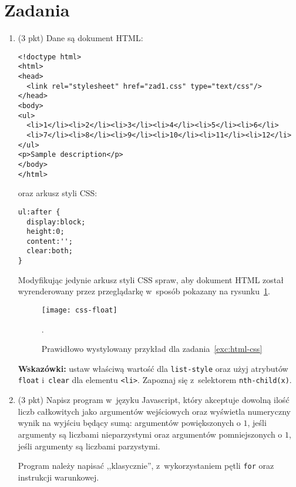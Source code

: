 \documentclass[12pt]{article}
\begin{document}
    \section*{Zadania}
    \begin{enumerate}
        \item\label{exc:html-css}
            (3 pkt) Dane są dokument HTML:
            \begin{verbatim}
<!doctype html>
<html>
<head>
  <link rel="stylesheet" href="zad1.css" type="text/css"/>
</head>
<body>
<ul>
  <li>1</li><li>2</li><li>3</li><li>4</li><li>5</li><li>6</li>
  <li>7</li><li>8</li><li>9</li><li>10</li><li>11</li><li>12</li>
</ul>
<p>Sample description</p>
</body>
</html>
            \end{verbatim}
            oraz arkusz styli CSS:
            \begin{verbatim}
ul:after {
  display:block;
  height:0;
  content:'';
  clear:both;
}
            \end{verbatim}
            Modyfikując jedynie arkusz styli CSS spraw, aby dokument HTML został wyrenderowany przez przeglądarkę w~sposób pokazany na rysunku~\ref{fig:css-float}.
            \begin{figure}[hb]
                \centering
                \texttt{[image: css-float]}
                \caption{Prawidłowo wystylowany przykład dla zadania~\ref{exc:html-css}}.
                \label{fig:css-float}
            \end{figure}

            \textbf{Wskazówki:} ustaw właściwą wartość dla \texttt{list-style} oraz użyj atrybutów \texttt{float} i~\texttt{clear} dla elementu \texttt{<li>}. Zapoznaj się z~selektorem \texttt{nth-child(x)}.
        \item\label{exc:javascript-classic}
            (3 pkt) Napisz program w~języku Javascript, który akceptuje dowolną ilość liczb całkowitych jako argumentów wejściowych oraz wyświetla numeryczny wynik na wyjściu będący sumą: argumentów powiększonych o $1$, jeśli argumenty są liczbami nieparzystymi oraz argumentów pomniejszonych o $1$, jeśli argumenty są liczbami parzystymi.

            Program należy napisać ,,klasycznie'', z~wykorzystaniem pętli \texttt{for} oraz instrukcji warunkowej.


\end{enumerate}
\end{document}
